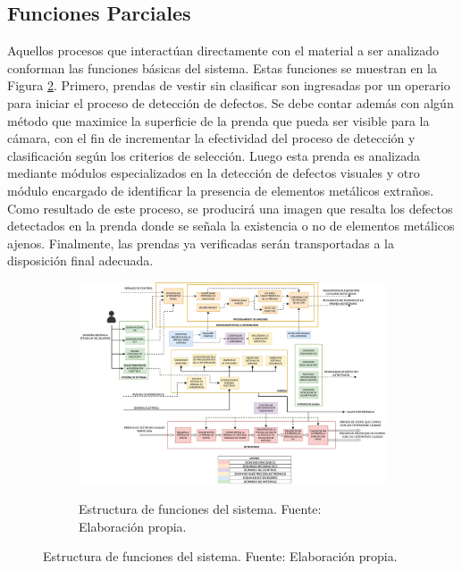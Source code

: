 \subsection{Funciones Parciales}
\label{Funciones Parciales}

Aquellos procesos que interactúan directamente con el material a ser analizado conforman las funciones básicas del sistema. Estas funciones se muestran en la Figura \ref{fig:ESTRUCTURA_DE_FUNCIONES}. Primero, prendas de vestir sin clasificar son ingresadas por un operario para iniciar el proceso de detección de defectos. Se debe contar además con algún método que maximice la superficie de la prenda que pueda ser visible para la cámara, con el fin de incrementar la efectividad del proceso de detección y clasificación según los criterios de selección. Luego esta prenda es analizada mediante módulos especializados en la detección de defectos visuales y otro módulo encargado de identificar la presencia de elementos metálicos extraños. Como resultado de este proceso, se producirá una imagen que resalta los defectos detectados en la prenda donde se señala la existencia o no de elementos metálicos ajenos. Finalmente, las prendas ya verificadas serán transportadas a la disposición final adecuada.

\begin{figure}
	\begin{figure}[H]
		\centering
		\includegraphics[width=\textwidth]{img/ESTRUCTURA_DE_FUNCIONES.drawio.pdf}
		\label{fig:ESTRUCTURA_DE_FUNCIONES}
		\caption[Estructura de funciones del sistema.]{Estructura de funciones del sistema. Fuente: Elaboración propia.}
	\end{figure}
\end{figure}

